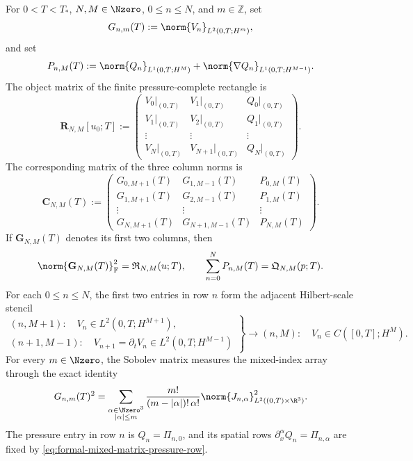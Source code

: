 \begin{proposition}
\label{prop:sobolev-rectangle-matrix}
For \(0<T<T_*\), \(N,M\in\Nzero\), \(0\le n\le N\), and
\(m\in\mathbb Z\), set
\[
 G_{n,m}(T):=\norm{V_n}_{L^2(0,T;H^m)},
\]
and set
\[
 P_{n,M}(T):=\norm{Q_n}_{L^1(0,T;H^M)}
 +\norm{\nabla Q_n}_{L^1(0,T;H^{M-1})}.
\]
The object matrix of the finite pressure-complete rectangle is
\begin{equation}
 \mathbf R_{N,M}[u_0;T]
 :=
 \begin{pmatrix}
  V_0|_{(0,T)}&V_1|_{(0,T)}&Q_0|_{(0,T)}\\
  V_1|_{(0,T)}&V_2|_{(0,T)}&Q_1|_{(0,T)}\\
  \vdots&\vdots&\vdots\\
  V_N|_{(0,T)}&V_{N+1}|_{(0,T)}&Q_N|_{(0,T)}
 \end{pmatrix}.
 \label{eq:finite-rectangle-object-matrix}
\end{equation}
The corresponding matrix of the three column norms is
\begin{equation}
 \mathbf C_{N,M}(T)
 :=
 \begin{pmatrix}
  G_{0,M+1}(T)&G_{1,M-1}(T)&P_{0,M}(T)\\
  G_{1,M+1}(T)&G_{2,M-1}(T)&P_{1,M}(T)\\
  \vdots&\vdots&\vdots\\
  G_{N,M+1}(T)&G_{N+1,M-1}(T)&P_{N,M}(T)
 \end{pmatrix}.
 \label{eq:sobolev-pressure-complete-rectangle-matrix}
\end{equation}
If \(\mathbf G_{N,M}(T)\) denotes its first two columns, then
\begin{equation}
 \norm{\mathbf G_{N,M}(T)}_{\mathrm F}^2
 =\mathfrak R_{N,M}(u;T),
 \qquad
 \sum_{n=0}^NP_{n,M}(T)=\mathfrak Q_{N,M}(p;T).
 \label{eq:rectangle-matrix-norm-identities}
\end{equation}
For each \(0\le n\le N\), the first two entries in row \(n\) form the
adjacent Hilbert-scale stencil
\begin{equation}
 \left.
 \begin{array}{c}
  (n,M+1):\quad V_n\in L^2(0,T;H^{M+1}),\\
  (n+1,M-1):\quad V_{n+1}=\partial_tV_n
                       \in L^2(0,T;H^{M-1})
 \end{array}
 \right\}
 \longrightarrow
 (n,M):\quad V_n\in C([0,T];H^M).
 \label{eq:rectangle-adjacent-stencil}
\end{equation}
For every \(m\in\Nzero\), the Sobolev matrix measures the mixed-index array
through the exact identity
\begin{equation}
 G_{n,m}(T)^2
 =\sum_{\substack{\alpha\in\Nzero^3\\|\alpha|\le m}}
   \frac{m!}{(m-|\alpha|)!\,\alpha!}
   \norm{J_{n,\alpha}}_{L^2((0,T)\times\R^3)}^2.
 \label{eq:rectangle-mixed-index-sobolev-identity}
\end{equation}
The pressure entry in row \(n\) is \(Q_n=\Pi_{n,0}\), and its spatial rows
\(\partial_x^\alpha Q_n=\Pi_{n,\alpha}\) are fixed by
\eqref{eq:formal-mixed-matrix-pressure-row}.
\end{proposition}


